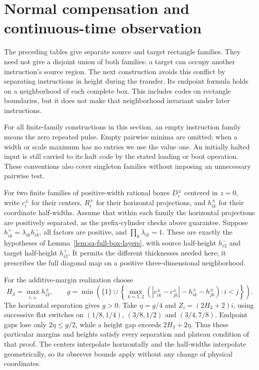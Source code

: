 \section{Normal compensation and continuous-time observation}
\label{sec:sb-geometry}
The preceding tables give separate source and target rectangle families.
They need not give a disjoint union of both families: a target can occupy
another instruction's source region. The next construction avoids this
conflict by separating instructions in height during the transfer. Its
endpoint formula holds on a neighborhood of each complete box. This
includes codes on rectangle boundaries, but it does not make that
neighborhood invariant under later instructions.

For all finite-family constructions in this section, an empty instruction
family means the zero repeated pulse. Empty pairwise minima are omitted;
when a width or scale maximum has no entries we use the value one.
An initially halted input is still carried to its halt code by the stated
loading or boot operation. These conventions also cover singleton
families without imposing an unnecessary pairwise test.

For two finite families of positive-width rational boxes $D_i^\pm$
centered in $z=0$, write $c_i^\pm$ for their centers, $R_i^\pm$ for their
horizontal projections, and $h_{ik}^\pm$ for their coordinate half-widths.
Assume that within each family the horizontal projections are positively
separated, as the prefix-cylinder checks above guarantee.
Suppose $h_{ik}^+=\lambda_{ik}h_{ik}^-$, all factors are positive, and
$\prod_k\lambda_{ik}=1$. These are exactly the hypotheses of
Lemma~\ref{lem:sa-full-box-layers}, with source half-height $h_{i3}^-$
and target half-height $h_{i3}^+$. It permits the different thicknesses
needed here; it prescribes the full diagonal map on a positive
three-dimensional neighborhood.

For the additive-margin realization choose
\[
 H_3=\max_{i,\pm}h_{i3}^\pm,\qquad
 g=\min\left(\{1\}\cup
 \left\{\max_{k=1,2}(|c_{ik}^\pm-c_{jk}^\pm|
           -h_{ik}^\pm-h_{jk}^\pm):i<j\right\}\right).
\]
The horizontal separation gives $g>0$. Take $\eta=g/4$ and
$Z_i=(2H_3+2)i$, using successive flat switches on
$(1/8,1/4)$, $(3/8,1/2)$ and $(3/4,7/8)$.
Endpoint gaps lose only $2\eta\le g/2$, while a height gap exceeds
$2H_3+2\eta$. Thus these particular margins and heights satisfy every
separation and plateau condition of that proof. The centers interpolate
horizontally and the half-widths interpolate geometrically, so its
observer bounds apply without any change of physical coordinates.

